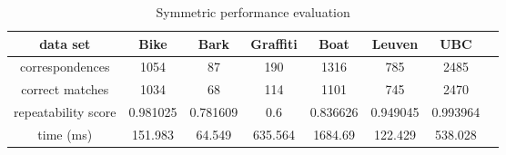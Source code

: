 \begin{table}[H]
  \begin{tabular}{| c || c | c | c | c | c | c | c |}
      \hline
      data set & Bike & Bark & Graffiti & Boat & Leuven & UBC \\ \hline \hline
      correspondences & 1054 & 87 & 190 & 1316 & 785 & 2485 \\ \hline
      correct matches & 1034 & 68 & 114 & 1101 & 745 & 2470 \\ \hline
      repeatability score & 0.981025 & 0.781609 & 0.6 & 0.836626 & 0.949045 & 0.993964 \\ \hline
      time (ms) & 151.983 & 64.549 & 635.564 & 1684.69 & 122.429 & 538.028 \\ \hline
  \end{tabular}
  \caption{Symmetric performance evaluation} \label{tab:symmetric_matching_eval}
\end{table}

